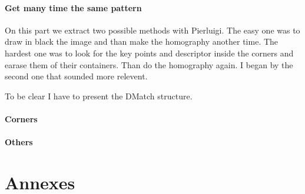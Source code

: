 \documentclass[english,a4paper,11pt]{report}
\begin{document}
	\subsubsection[Multiple pattern]{Get many time the same pattern}

	\par On this part we extract two possible methods with Pierluigi. The easy one was to draw in black the image and than make the homography another time. The hardest one was to look for the key points and descriptor inside the corners and earase them of their containers. Than do the homography again. I began by the second one that sounded more relevent. 
	
	\par To be clear I have to present the DMatch structure.
	
	\subsubsection{Corners}
	
	\subsubsection{Others}
	
	

	\clearpage

	{}
	

	\chapter{Annexes}
	
\end{document}
